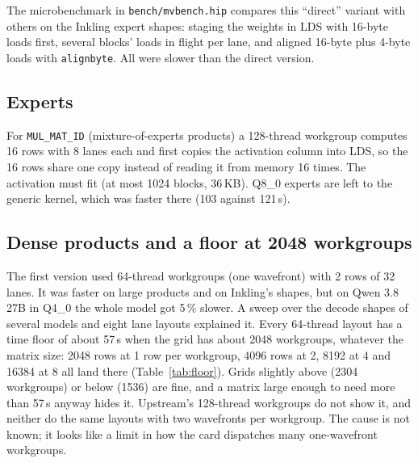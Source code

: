 \documentclass[11pt,a4paper]{article}
\newcommand{\code}[1]{\texttt{#1}}
\begin{document}
The microbenchmark in \code{bench/mvbench.hip} compares this ``direct'' variant with others on the Inkling expert
shapes: staging the weights in LDS with 16-byte loads first, several blocks' loads in flight per lane, and aligned
16-byte plus 4-byte loads with \code{alignbyte}. All were slower than the direct version.

\subsection{Experts}

For \code{MUL\_MAT\_ID} (mixture-of-experts products) a 128-thread workgroup computes 16 rows with 8 lanes each and
first copies the activation column into LDS, so the 16 rows share one copy instead of reading it from memory 16 times.
The activation must fit (at most 1024 blocks, 36\,KB). Q8\_0 experts are left to the generic kernel, which was faster
there (103 against 121\,\textmu s).

\subsection{Dense products and a floor at 2048 workgroups}
\label{sec:floor}

The first version used 64-thread workgroups (one wavefront) with 2 rows of 32 lanes. It was faster on large products
and on Inkling's shapes, but on Qwen 3.8 27B in Q4\_0 the whole model got 5\,\% slower. A sweep over the decode shapes
of several models and eight lane layouts explained it. Every 64-thread layout has a time floor of about 57\,\textmu s when the grid has about 2048
workgroups, whatever the matrix size: 2048 rows at 1 row per workgroup, 4096 rows at 2, 8192 at 4 and 16384 at 8 all
land there (Table~\ref{tab:floor}). Grids slightly above (2304 workgroups) or below (1536) are fine, and a matrix large
enough to need more than 57\,\textmu s anyway hides it. Upstream's 128-thread workgroups do not show it, and neither
do the same layouts with two wavefronts per workgroup. The cause is not known; it looks like a limit in how the card
dispatches many one-wavefront workgroups.
\end{document}
